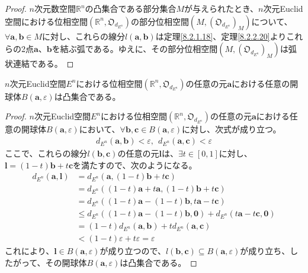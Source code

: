 \documentclass[dvipdfmx]{jsarticle}
\begin{document}
\begin{proof}
$n$次元数空間$\mathbb{R}^{n}$の凸集合である部分集合$M$が与えられたとき、$n$次元Euclid空間における位相空間$\left( \mathbb{R}^{n},\mathfrak{O}_{d_{E^{n}}} \right)$の部分位相空間$\left( M,\left( \mathfrak{O}_{d_{E^{n}}} \right)_{M} \right)$について、$\forall\mathbf{a},\mathbf{b} \in M$に対し、これらの線分$l\left( \mathbf{a},\mathbf{b} \right)$は定理\ref{8.2.1.18}、定理\ref{8.2.2.20}よりこれらの2点$\mathbf{a}$、$\mathbf{b}$を結ぶ弧である。ゆえに、その部分位相空間$\left( M,\left( \mathfrak{O}_{d_{E^{n}}} \right)_{M} \right)$は弧状連結である。
\end{proof}
\begin{thm}\label{8.2.2.22}
$n$次元Euclid空間$E^{n}$における位相空間$\left( \mathbb{R}^{n},\mathfrak{O}_{d_{E^{n}}} \right)$の任意の元$\mathbf{a}$における任意の開球体$B\left( \mathbf{a},\varepsilon \right)$は凸集合である。
\end{thm}
\begin{proof}
$n$次元Euclid空間$E^{n}$における位相空間$\left( \mathbb{R}^{n},\mathfrak{O}_{d_{E^{n}}} \right)$の任意の元$\mathbf{a}$における任意の開球体$B\left( \mathbf{a},\varepsilon \right)$において、$\forall\mathbf{b},\mathbf{c} \in B\left( \mathbf{a},\varepsilon \right)$に対し、次式が成り立つ。
\begin{align*}
d_{E^{n}}\left( \mathbf{a},\mathbf{b} \right) < \varepsilon,\ \ d_{E^{n}}\left( \mathbf{a},\mathbf{c} \right) < \varepsilon
\end{align*}
ここで、これらの線分$l\left( \mathbf{b},\mathbf{c} \right)$の任意の元$\mathbf{l}$は、$\exists t \in [ 0,1]$に対し、$\mathbf{l} = (1 - t)\mathbf{b} + t\mathbf{c}$を満たすので、次のようになる。
\begin{align*}
d_{E^{n}}\left( \mathbf{a},\mathbf{l} \right) &= d_{E^{n}}\left( \mathbf{a},(1 - t)\mathbf{b} + t\mathbf{c} \right)\\
&= d_{E^{n}}\left( (1 - t)\mathbf{a} + t\mathbf{a},(1 - t)\mathbf{b} + t\mathbf{c} \right)\\
&= d_{E^{n}}\left( (1 - t)\mathbf{a} - (1 - t)\mathbf{b},t\mathbf{a} - t\mathbf{c} \right)\\
&\leq d_{E^{n}}\left( (1 - t)\mathbf{a} - (1 - t)\mathbf{b},\mathbf{0} \right) + d_{E^{n}}\left( t\mathbf{a} - t\mathbf{c},\mathbf{0} \right)\\
&= (1 - t)d_{E^{n}}\left( \mathbf{a},\mathbf{b} \right) + td_{E^{n}}\left( \mathbf{a},\mathbf{c} \right)\\
&< (1 - t)\varepsilon + t\varepsilon = \varepsilon
\end{align*}
これにより、$\mathbf{l} \in B\left( \mathbf{a},\varepsilon \right)$が成り立つので、$l\left( \mathbf{b},\mathbf{c} \right) \subseteq B\left( \mathbf{a},\varepsilon \right)$が成り立ち、したがって、その開球体$B\left( \mathbf{a},\varepsilon \right)$は凸集合である。
\end{proof}
\end{document}
